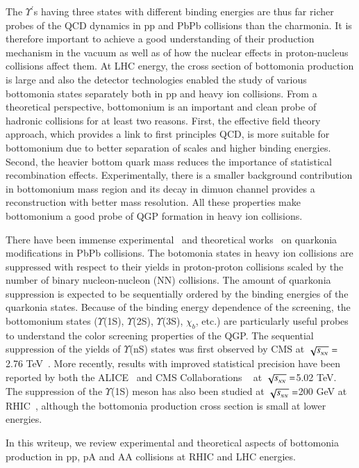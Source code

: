 The $\Upsilon^{'}$s having three states with different binding
energies are thus far richer probes of the QCD dynamics in pp and PbPb collisions than
the charmonia.
It is therefore important to achieve a good understanding of their
production mechanism in the vacuum as well as of how the nuclear effects in proton-nucleus
collisions affect them.
  At LHC energy, the cross section of bottomonia production is large and
also the detector technologies enabled the study of various bottomonia 
states separately both in pp and heavy ion collisions.
From a theoretical perspective, bottomonium is an important and clean probe 
of hadronic collisions for at least two reasons. 
First, the effective field theory approach, which provides a link to first 
principles QCD, is more suitable for bottomonium due to better separation of 
scales and higher binding energies. Second, the heavier bottom quark 
mass reduces the importance of statistical recombination effects.
Experimentally, there is a smaller background contribution in bottomonium
mass region and its decay in dimuon channel provides a reconstruction with better
mass resolution. 
 All these properties make bottomonium a good probe of 
QGP formation in heavy ion collisions.


There have been immense
experimental~\cite{Sirunyan:2017isk,Sirunyan:2017lzi,Sirunyan:2018nsz,Acharya:2019iur,Acharya:2018mni}
and theoretical works~\cite{Strickland:2011mw,Song:2011nu,Kumar:2014kfa,Kumar:2019xdj} on
quarkonia modifications in PbPb collisions.
The botomonia states in heavy ion collisions are suppressed with respect to their yields
in proton-proton collisions scaled by the number of binary nucleon-nucleon
(NN) collisions.
The amount of quarkonia suppression is expected to be sequentially ordered by the binding
energies of the quarkonia states.
 Because of the binding energy
dependence of the screening, the bottomonium states ($\Upsilon$(1S), $\Upsilon$(2S),
$\Upsilon$(3S), $\chi_{b}$, etc.) are particularly useful probes to understand the color screening
properties of the QGP.
The sequential suppression of the yields of $\Upsilon$(nS) states was first observed by
CMS at $\sqrt{s_{_{NN}}} =$2.76 TeV~\cite{Chatrchyan:2011pe,Chatrchyan:2012lxa}. More recently, results with improved
statistical precision have been reported by both the ALICE~\cite{ALICE:2018wzm}
and CMS Collaborations ~\cite{Sirunyan:2017lzi,Sirunyan:2018nsz} at $\sqrt{s_{_{NN}}} =$5.02 TeV.
The suppression of the $\Upsilon$(1S)
meson has also been studied at $\sqrt{s_{_{NN}}} =$200 GeV at RHIC~\cite{STAR:2013kwk}, although the
bottomonia production cross section is small at lower energies. 

In this writeup, we review experimental and theoretical aspects of bottomonia production in pp, pA
and AA collisions at RHIC and LHC energies.







